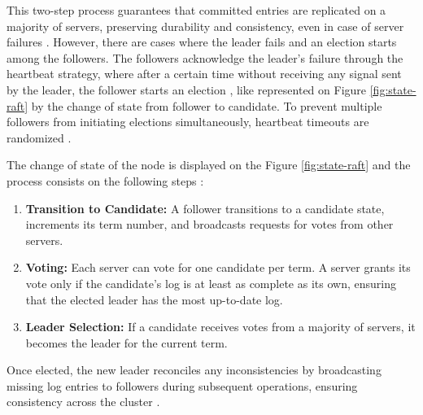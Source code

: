 This two-step process guarantees that committed entries are replicated on a majority of servers, preserving durability and consistency, even in case of server failures \cite{Tanenbaum2023}. However, there are cases where the leader fails and an election starts among the followers. The followers acknowledge the leader’s failure through the heartbeat strategy, where after a certain time without receiving any signal sent by the leader, the follower starts an election \cite{Vitillo2021,raft-diego}, like represented on Figure \ref{fig:state-raft} by the change of state from follower to candidate. To prevent multiple followers from initiating elections simultaneously, heartbeat timeouts are randomized \cite{Vitillo2021, Tanenbaum2023}.


The change of state of the node is displayed on the Figure \ref{fig:state-raft} and the process consists on the following steps \cite{Vitillo2021,raft-diego}:
\begin{enumerate}
    \item 	\textbf{Transition to Candidate:} A follower transitions to a candidate state, increments its term number, and broadcasts requests for votes from other servers.
    \item 	\textbf{Voting:} Each server can vote for one candidate per term. A server grants its vote only if the candidate’s log is at least as complete as its own, ensuring that the elected leader has the most up-to-date log.
    \item 	\textbf{Leader Selection:} If a candidate receives votes from a majority of servers, it becomes the leader for the current term.
\end{enumerate}

Once elected, the new leader reconciles any inconsistencies by broadcasting missing log entries to followers during subsequent operations, ensuring consistency across the cluster \cite{Tanenbaum2023}.


